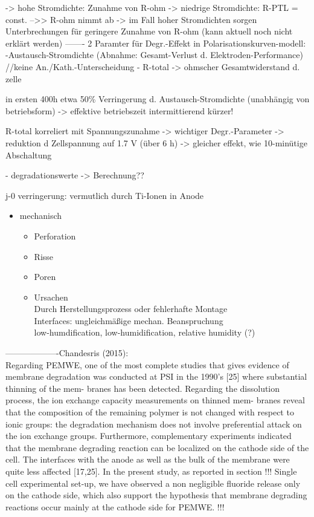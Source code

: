 \documentclass[onecolumn,10pt,titlepage]{article}
\begin{document}
-> hohe Stromdichte: Zunahme von R-ohm
-> niedrige Stromdichte: R-PTL = const. -->> R-ohm nimmt ab
-> im Fall hoher Stromdichten sorgen Unterbrechungen für geringere Zunahme von R-ohm (kann aktuell noch nicht erklärt werden)
-------
2 Paramter für Degr.-Effekt in Polarisationskurven-modell:
-Austausch-Stromdichte (Abnahme: Gesamt-Verlust d. Elektroden-Performance) //keine An./Kath.-Unterscheidung
- R-total -> ohmscher Gesamtwiderstand d. zelle

in ersten 400h etwa 50\% Verringerung d. Austausch-Stromdichte (unabhängig von betriebsform) -> effektive betriebszeit intermittierend kürzer!

R-total korreliert mit Spannungszunahme -> wichtiger Degr.-Parameter
-> reduktion d Zellspannung auf 1.7 V (über 6 h) -> gleicher effekt, wie 10-minütige Abschaltung 

- degradationswerte -> Berechnung??

j-0 verringerung: vermutlich durch Ti-Ionen in Anode



\begin{itemize}
\item mechanisch

\begin{itemize}
\item Perforation
\item Risse
\item Poren
\item Ursachen\\
Durch Herstellungsprozess oder fehlerhafte Montage\\
Interfaces: ungleichmäßige mechan. Beanspruchung\\
low-humdification, low-humidification, relative humidity (?)\\
\end{itemize}

\end{itemize}

-------------------Chandesris (2015):\\
Regarding PEMWE, one of the most complete studies that
gives evidence of membrane degradation was conducted at
PSI in the 1990's [25] where substantial thinning of the mem-
branes has been detected. Regarding the dissolution process,
the ion exchange capacity measurements on thinned mem-
branes reveal that the composition of the remaining polymer
is not changed with respect to ionic groups: the degradation
mechanism does not involve preferential attack on the ion
exchange groups. Furthermore, complementary experiments
indicated that the membrane degrading reaction can be
localized on the cathode side of the cell. The interfaces with the anode as well as the bulk of the membrane were quite less
affected [17,25]. In the present study, as reported in section
!!!
Single cell experimental set-up, we have observed a non
negligible fluoride release only on the cathode side, which also
support the hypothesis that membrane degrading reactions
occur mainly at the cathode side for PEMWE.
!!!
\end{document}
